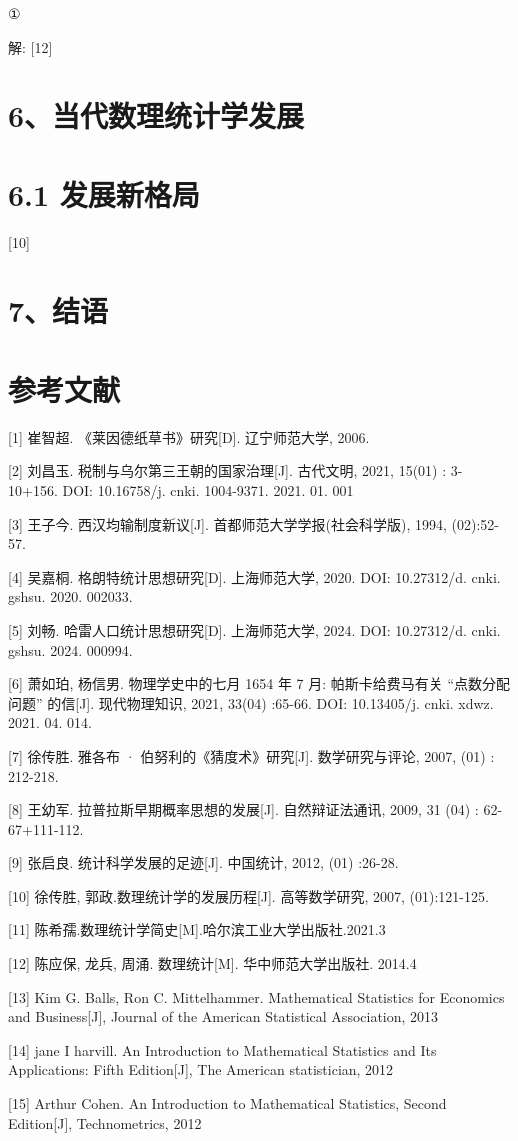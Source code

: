 

① 

解: [12]



\section*{6、当代数理统计学发展}

\section*{6.1 发展新格局}

[10]

\section*{7、结语}



\section*{参考文献}

[1] 崔智超. 《莱因德纸草书》研究[D]. 辽宁师范大学, 2006.

[2] 刘昌玉. 税制与乌尔第三王朝的国家治理[J]. 古代文明, 2021, 15(01) : 3-10+156. DOI: 10.16758/j. cnki. 1004-9371. 2021. 01. 001

[3] 王子今. 西汉均输制度新议[J]. 首都师范大学学报(社会科学版), 1994, (02):52-57.

[4] 吴嘉桐. 格朗特统计思想研究[D]. 上海师范大学, 2020. DOI: 10.27312/d. cnki. gshsu. 2020. 002033.

[5] 刘畅. 哈雷人口统计思想研究[D]. 上海师范大学, 2024. DOI: 10.27312/d. cnki. gshsu. 2024. 000994.

[6] 萧如珀, 杨信男. 物理学史中的七月 1654 年 7 月: 帕斯卡给费马有关 “点数分配问题” 的信[J]. 现代物理知识, 2021, 33(04) :65-66. DOI: 10.13405/j. cnki. xdwz. 2021. 04. 014.

[7] 徐传胜. 雅各布 · 伯努利的《猜度术》研究[J]. 数学研究与评论, 2007, (01) : 212-218.

[8] 王幼军. 拉普拉斯早期概率思想的发展[J]. 自然辩证法通讯, 2009, 31 (04) : 62-67+111-112.

[9] 张启良. 统计科学发展的足迹[J]. 中国统计, 2012, (01) :26-28.

[10] 徐传胜, 郭政.数理统计学的发展历程[J]. 高等数学研究, 2007, (01):121-125.

[11] 陈希孺.数理统计学简史[M].哈尔滨工业大学出版社.2021.3

[12] 陈应保, 龙兵, 周涌. 数理统计[M]. 华中师范大学出版社. 2014.4

[13] Kim G. Balls, Ron C. Mittelhammer. Mathematical Statistics for Economics and Business[J], Journal of the American Statistical Association, 2013

[14] jane I harvill. An Introduction to Mathematical Statistics and Its Applications: Fifth Edition[J], The American statistician, 2012

[15] Arthur Cohen. An Introduction to Mathematical Statistics, Second Edition[J], Technometrics, 2012
